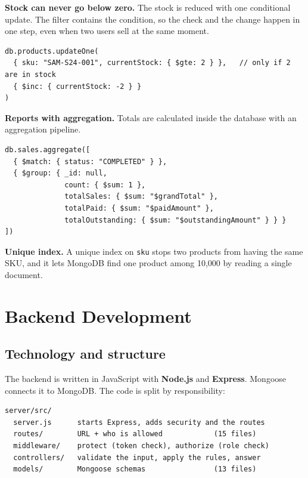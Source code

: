 \documentclass[11pt,a4paper]{article}
\newcommand{\code}[1]{\texttt{#1}}
\begin{document}
\textbf{Stock can never go below zero.} The stock is reduced with one conditional update. The filter contains the condition, so the check and the change happen in one step, even when two users sell at the same moment.
\begin{lstlisting}[style=query]
db.products.updateOne(
  { sku: "SAM-S24-001", currentStock: { $gte: 2 } },   // only if 2 are in stock
  { $inc: { currentStock: -2 } }
)
\end{lstlisting}

\textbf{Reports with aggregation.} Totals are calculated inside the database with an aggregation pipeline.
\begin{lstlisting}[style=query]
db.sales.aggregate([
  { $match: { status: "COMPLETED" } },
  { $group: { _id: null,
              count: { $sum: 1 },
              totalSales: { $sum: "$grandTotal" },
              totalPaid: { $sum: "$paidAmount" },
              totalOutstanding: { $sum: "$outstandingAmount" } } }
])
\end{lstlisting}

\textbf{Unique index.} A unique index on \code{sku} stops two products from having the same SKU, and it lets MongoDB find one product among 10,000 by reading a single document.

\section{Backend Development}
\subsection{Technology and structure}
The backend is written in JavaScript with \textbf{Node.js} and \textbf{Express}. Mongoose connects it to MongoDB. The code is split by responsibility:
\begin{lstlisting}[style=query]
server/src/
  server.js      starts Express, adds security and the routes
  routes/        URL + who is allowed            (15 files)
  middleware/    protect (token check), authorize (role check)
  controllers/   validate the input, apply the rules, answer
  models/        Mongoose schemas                (13 files)
\end{lstlisting}
\end{document}
